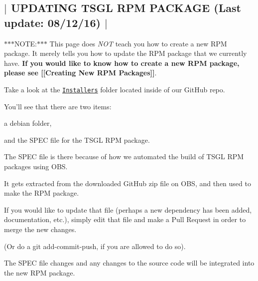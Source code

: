 

 \subsection*{$\vert$ U\-P\-D\-A\-T\-I\-N\-G T\-S\-G\-L R\-P\-M P\-A\-C\-K\-A\-G\-E (Last update\-: 08/12/16) $\vert$ }

$\ast$$\ast$$\ast$\-N\-O\-T\-E\-:$\ast$$\ast$$\ast$ This page does {\itshape N\-O\-T} teach you how to create a new R\-P\-M package. It merely tells you how to update the R\-P\-M package that we currently have. {\bfseries If you would like to know how to create a new R\-P\-M package, please see \mbox{[}\mbox{[}Creating New R\-P\-M Packages\mbox{]}\mbox{]}}.

Take a look at the \href{https://github.com/Calvin-CS/TSGL/tree/master/Installers}{\tt Installers} folder located inside of our Git\-Hub repo.

You'll see that there are two items\-:


\begin{DoxyItemize}
\item a {\ttfamily debian} folder,
\item and the S\-P\-E\-C file for the T\-S\-G\-L R\-P\-M package.
\end{DoxyItemize}

The S\-P\-E\-C file is there because of how we automated the build of T\-S\-G\-L R\-P\-M packages using O\-B\-S.

It gets extracted from the downloaded Git\-Hub zip file on O\-B\-S, and then used to make the R\-P\-M package.

If you would like to update that file (perhaps a new dependency has been added, documentation, etc.), simply edit that file and make a Pull Request in order to merge the new changes.

(Or do a git add-\/commit-\/push, if you are allowed to do so).

The S\-P\-E\-C file changes and any changes to the source code will be integrated into the new R\-P\-M package. 